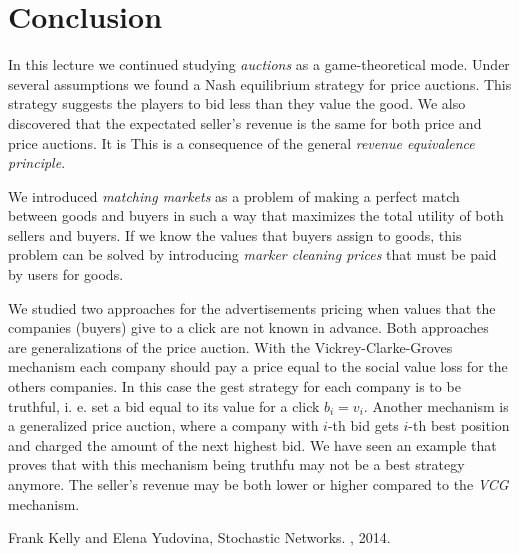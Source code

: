 \section{Conclusion}

In this lecture we continued studying \textit{auctions} as a game-theoretical mode. Under several assumptions we found a Nash equilibrium  strategy for  price auctions. This strategy suggests the players to bid less than they value the good. We also discovered that the expectated seller's revenue is the same for both  price and  price auctions. It is This is a consequence of the general \textit{revenue equivalence principle}.

We introduced \textit{matching markets} as a problem of making a perfect match between goods and buyers in such a way that maximizes the total utility of both sellers and buyers. If we know the values that buyers assign to goods, this problem can be solved by introducing \textit{marker cleaning prices} that must be paid by users for goods.

We studied two approaches for the advertisements pricing when values that the companies (buyers) give to a click are not known in advance. Both approaches are generalizations of the  price auction. With the Vickrey-Clarke-Groves mechanism each company should pay a price equal to the social value loss for the others companies. In this case the gest strategy for each company is to be truthful, i. e. set a bid equal to its value for a click $b_i = v_i$. Another mechanism is a generalized  price auction, where a company with $i$-th bid gets $i$-th best position and charged the amount of the next highest bid. We have seen an example that proves that with this mechanism being truthfu may not be a best strategy anymore. The seller's revenue may be both lower or higher compared to the \textit{VCG} mechanism.


\begin{thebibliography}{alpha}

 Frank Kelly and Elena Yudovina,
\newblock Stochastic Networks.
, 2014.

\end{thebibliography}



